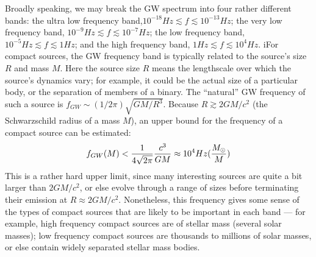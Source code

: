 \documentclass[binding=0.6cm, LaM]{sapthesis}
\begin{document}
Broadly speaking, we may break the GW spectrum into four rather different bands: the ultra low frequency band,$10^{-18}Hz \apprle f \apprle 10^{-13} Hz$;
the very low frequency band, $10^{-9} Hz \apprle f \apprle 10^{-7} Hz$; the low frequency band, $10^{-5} Hz \apprle f \apprle 1Hz$; and the high frequency band, $1Hz \apprle f \apprle 10^4 Hz$.
iFor compact sources, the GW frequency band is typically related to the source’s size $R$ and mass $M$.
Here the source size $R$ means the lengthscale over which the source’s dynamics vary; for example, it could be the actual size of a particular body, or the separation of members of a binary.
The “natural” GW frequency of such a source is $f_{GW} \sim (1/2\pi)\sqrt{GM/R^3}$. Because $R \apprge 2GM/c^2$ (the Schwarzschild radius of a mass $M$), an upper bound for the frequency of a compact
 source can be estimated:
\begin{equation}
f_{GW}(M) < {1 \over {4\sqrt{2 \pi}}}{{c^3}\over{GM}} \approx 10^4 Hz ({{M_{\odot}} \over M})
\end{equation}
This is a rather hard upper limit, since many interesting sources are quite a bit larger than $2GM/c^2$, or else evolve through a range of sizes before terminating their emission at
 $R \approx 2GM/c^2$. Nonetheless, this frequency gives some sense of the types of compact sources that are likely to be important in each band — for example,
high frequency compact sources are of stellar mass (several solar masses);
low frequency compact sources are thousands to millions of solar masses, or else contain widely separated stellar mass bodies.
\end{document}

